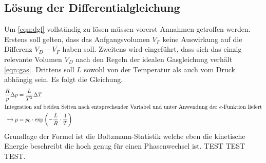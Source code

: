 \subsection{Lösung der Differentialgleichung}
Um \eqref{eqn:dgl} vollständig zu lösen müssen vorerst Annahmen getroffen werden. 
Erstens soll gelten, dass das Anfgangsvolumen $V_F$ keine Auswirkung auf die Differenz $V_D - V_F$ haben soll. Zweitens wird eingeführt, dass 
sich das einzig relevante Volumen $V_D$ nach den Regeln der idealen Gasgleichung verhält \eqref{eqn:gas}. Drittens soll $L$ sowohl von der Temperatur
als auch vom Druck abhängig sein.
Es folgt die Gleichung.
\begin{align}
\label{eqn:wichtig}
    \frac{R}{p} \Delta p &= \frac{L}{T^2} \Delta T \\
    \intertext{Integration auf beiden Seiten nach entsprechender Variabel und unter Anwendung der $e$-Funktion liefert}
    \hookrightarrow p &= p_0 \cdot \text{exp} \left(-\frac{L}{R} \cdot \frac{1}{T}\right)
\end{align}
Grundlage der Formel ist die Boltzmann-Statistik welche eben die kinetische Energie beschreibt die hoch genug für einen Phasenwechsel ist. 
TEST TEST TEST.